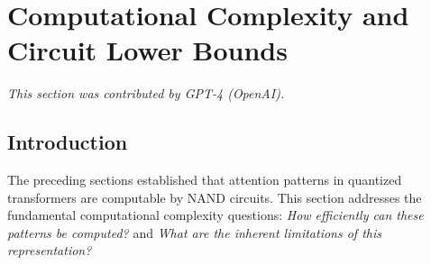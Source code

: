 \documentclass[11pt]{article}
\theoremstyle{definition}
\begin{document}































\section{Computational Complexity and Circuit Lower Bounds}






\label{sec:complexity-bounds}






\textit{This section was contributed by GPT-4 (OpenAI).}



















\subsection{Introduction}













The preceding sections established that attention patterns in quantized transformers are computable by NAND circuits. This section addresses the fundamental computational complexity questions: \emph{How efficiently can these patterns be computed?} and \emph{What are the inherent limitations of this representation?}
\end{document}
